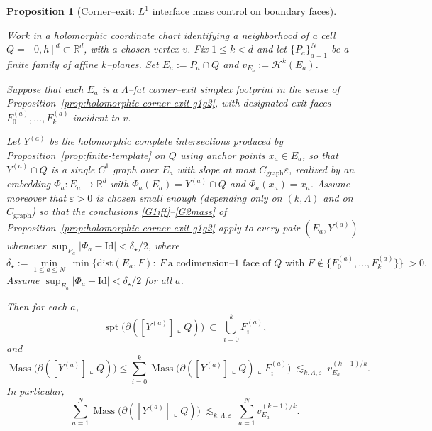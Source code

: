 \documentclass[11pt]{article}
\numberwithin{equation}{section}  %
\theoremstyle{plain}
\newtheorem{proposition}[theorem]{Proposition}
\theoremstyle{definition}
\theoremstyle{remark}
\newcommand{\R}{\mathbb{R}}
\DeclareMathOperator{\Mass}{Mass}
\newcommand{\dist}{\mathrm{dist}}
\begin{document}
\begin{proposition}[{Corner--exit: $L^1$ interface mass control on boundary faces}]\label{prop:holomorphic-corner-exit-L1}

Work in a holomorphic coordinate chart identifying a neighborhood of a cell $Q=[0,h]^d\subset\R^d$, with a chosen vertex $v$.
Fix $1\le k<d$ and let $\{P_a\}_{a=1}^N$ be a finite family of affine $k$--planes.
Set $E_a:=P_a\cap Q$ and $v_{E_a}:=\mathcal H^k(E_a)$.

Suppose that each $E_a$ is a $\Lambda$--fat corner--exit simplex footprint in the sense of
Proposition~\ref{prop:holomorphic-corner-exit-g1g2}, with designated exit faces
$F_0^{(a)},\dots,F_k^{(a)}$ incident to $v$.

Let $Y^{(a)}$ be the holomorphic complete intersections produced by Proposition~\ref{prop:finite-template} on $Q$ using anchor points
$x_a\in E_a$, so that $Y^{(a)}\cap Q$ is a single $C^1$ graph over $E_a$ with slope at most $C_{\mathrm{graph}}\varepsilon$,
realized by an embedding $\Phi_a:E_a\to\R^d$ with $\Phi_a(E_a)=Y^{(a)}\cap Q$ and $\Phi_a(x_a)=x_a$.
Assume moreover that $\varepsilon>0$ is chosen small enough (depending only on $(k,\Lambda)$ and on $C_{\mathrm{graph}}$) so that the
conclusions \eqref{G1iff}--\eqref{G2mass} of Proposition~\ref{prop:holomorphic-corner-exit-g1g2} apply to every pair $(E_a,Y^{(a)})$
whenever $\sup_{E_a}|\Phi_a-\mathrm{Id}|<\delta_\star/2$, where
\[
\delta_\star:=\min_{1\le a\le N}\ \min\{\dist(E_a,F):\ F\ \text{a codimension--$1$ face of $Q$ with }F\notin\{F_0^{(a)},\dots,F_k^{(a)}\}\}\ >0.
\]
Assume $\sup_{E_a}|\Phi_a-\mathrm{Id}|<\delta_\star/2$ for all $a$.

Then for each $a$,
\[
\operatorname{spt}\bigl(\partial([Y^{(a)}]\llcorner Q)\bigr)\ \subset\ \bigcup_{i=0}^k F_i^{(a)},
\]
and
\[
\Mass\bigl(\partial([Y^{(a)}]\llcorner Q)\bigr)
\le \sum_{i=0}^k \Mass\bigl(\partial([Y^{(a)}]\llcorner Q)\llcorner F_i^{(a)}\bigr)
\ \lesssim_{k,\Lambda,\varepsilon}\ v_{E_a}^{(k-1)/k}.
\]
In particular,
\[
\sum_{a=1}^N \Mass\bigl(\partial([Y^{(a)}]\llcorner Q)\bigr)
\ \lesssim_{k,\Lambda,\varepsilon}\ \sum_{a=1}^N v_{E_a}^{(k-1)/k}.
\]

\end{proposition}
\end{document}
